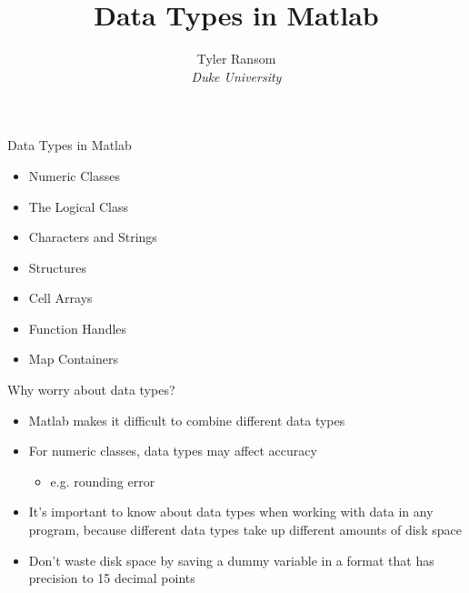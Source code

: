 \documentclass[english,xcolor=dvipsnames]{beamer}
\begin{document}
\begin{frame}
\title{Data Types in Matlab}
\author{
	Tyler Ransom\\
	\emph{Duke University}\\
}
\titlepage
\end{frame}

\begin{frame}{Data Types in Matlab}
\begin{itemize}
\item Numeric Classes
\item The Logical Class
\item Characters and Strings
\item Structures
\item Cell Arrays
\item Function Handles
\item Map Containers
\end{itemize}
\end{frame}


\begin{frame}{Why worry about data types?}
\begin{itemize}
\item Matlab makes it difficult to combine different data types
\item For numeric classes, data types may affect accuracy
\begin{itemize}
\item e.g. rounding error
\end{itemize}
\item It's important to know about data types when working with data in
any program, because different data types take up different amounts
of disk space
\item Don't waste disk space by saving a dummy variable in a format that
has precision to 15 decimal points
\end{itemize}
\end{frame}
\end{document}
